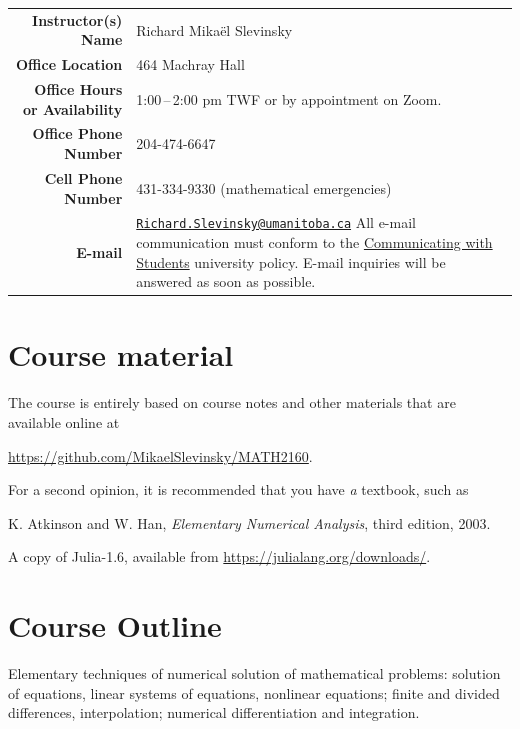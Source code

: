 \documentclass[12pt]{article}
\newlength{\infoTableSpace}
\begin{document}
\noindent
\begin{tabular*}{\linewidth}{r@{\hspace{\infoTableSpace}}l}
	\toprule
	\textbf{Instructor(s) Name} 			& Richard Mika\"el Slevinsky 	\\ 
	\textbf{Office Location}				& 464 Machray Hall	\\
	\textbf{Office Hours or Availability} & 1:00\,--\,2:00 pm TWF or by appointment on Zoom.\\
	\textbf{Office Phone Number} 			& 204-474-6647	\\
	\textbf{Cell Phone Number} 			& 431-334-9330 (mathematical emergencies) \\
	\textbf{E-mail}	& \begin{minipage}[t]{0.65\linewidth}	
			\href{mailto:Richard.Slevinsky@umanitoba.ca}{\texttt{Richard.Slevinsky@umanitoba.ca}}
			All e-mail communication must conform to the 
			\href{http://umanitoba.ca/admin/governance/media/Electronic_Communication_with_Students_Policy_-_2014_06_05.pdf}{Communicating with Students} university policy. E-mail inquiries will be answered as soon as possible.			
		\end{minipage} \\
	\bottomrule
\end{tabular*}


\section{Course material}

The course is entirely based on course notes and other materials that are available online at

\href{https://github.com/MikaelSlevinsky/MATH2160}{https://github.com/MikaelSlevinsky/MATH2160}.

For a second opinion, it is recommended that you have {\em a} textbook, such as

K. Atkinson and W. Han, {\em Elementary Numerical Analysis}, third edition, 2003.

A copy of {\sc Julia-1.6}, available from \href{https://julialang.org/downloads/}{https://julialang.org/downloads/}.

\section{Course Outline}

Elementary techniques of numerical solution of mathematical problems: solution of equations, linear systems of equations, nonlinear equations; finite and divided differences, interpolation; numerical differentiation and integration.
\end{document}
